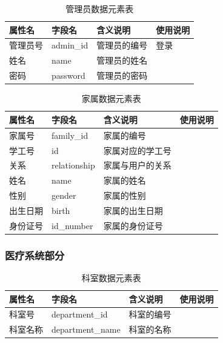\documentclass{article}
\begin{document}
\begin{table}[H]
    \centering
    \begin{tabularx}{\textwidth}{|p{2.2cm}|p{3.3cm}|p{4.7cm}|p{5cm}|}
    \toprule
    \textbf{属性名} & \textbf{字段名} & \textbf{含义说明} & \textbf{使用说明} \\ \midrule
    管理员号 & admin\_id & 管理员的编号 & 登录 \\ \midrule
    姓名 & name & 管理员的姓名 &  \\ \midrule
    密码 & password & 管理员的密码 &  \\ \bottomrule
    \end{tabularx}
    \caption{管理员数据元素表}
    \label{tab:admin_user_elements}
\end{table}

\begin{table}[H]
    \centering
    \begin{tabularx}{\textwidth}{|p{2.2cm}|p{3.3cm}|p{4.7cm}|p{5cm}|}
    \toprule
    \textbf{属性名} & \textbf{字段名} & \textbf{含义说明} & \textbf{使用说明} \\ \midrule
    家属号 & family\_id & 家属的编号 &  \\ \midrule
    学工号 & id & 家属对应的学工号 &  \\ \midrule
    关系 & relationship & 家属与用户的关系 &  \\ \midrule
    姓名 & name & 家属的姓名 &  \\ \midrule
    性别 & gender & 家属的性别 &  \\ \midrule
    出生日期 & birth & 家属的出生日期 &  \\ \midrule
    身份证号 & id\_number & 家属的身份证号 &  \\ \bottomrule
    \end{tabularx}
    \caption{家属数据元素表}
    \label{tab:family_user_elements}
\end{table}

\subsubsection{医疗系统部分}

\begin{table}[H]
    \centering
    \begin{tabularx}{\textwidth}{|p{2.2cm}|p{3.3cm}|p{4.7cm}|p{5cm}|}
    \toprule
    \textbf{属性名} & \textbf{字段名} & \textbf{含义说明} & \textbf{使用说明} \\ \midrule
    科室号 & department\_id & 科室的编号 &  \\ \midrule
    科室名称 & department\_name & 科室的名称 &  \\ \bottomrule
    \end{tabularx}
    \caption{科室数据元素表}
    \label{tab:department_elements}
\end{table}
\end{document}

